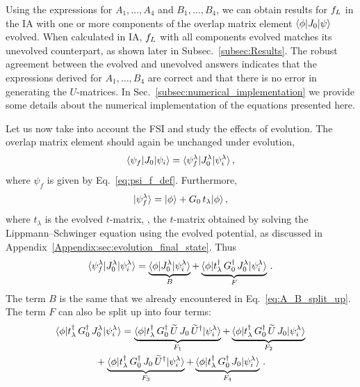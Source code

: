 	Using the expressions for $A_1,\ldots, A_4$ and $B_1,\ldots, B_4$, we can
	obtain results for $f_L$ in the IA with one or more components of the overlap
	matrix element $\langle \phi|J_0|\psi\rangle$ evolved.  When calculated in IA,
	$f_L$ with all components evolved matches its unevolved counterpart, as shown
	later	in Subsec.~\ref{subsec:Results}.
	The robust agreement between the evolved and unevolved answers indicates that
	the expressions derived for $A_1, \ldots, B_4$ are correct and that there is
	no error in generating the $U$-matrices.  In
	Sec.~\ref{subsec:numerical_implementation} we provide some details about the
	numerical implementation of the equations presented here.

	Let us now take into account the FSI and study the effects
	of evolution.  The overlap matrix element should again be unchanged under
	evolution,
	\begin{equation}
	 \langle \psi_f|J_0|\psi_i\rangle
	 = \langle \psi_f^\lambda|J_0^\lambda|\psi_i^\lambda\rangle \,,
	\end{equation}
	where $\psi_f$ is given by Eq.~\eqref{eq:psi_f_def}.  Furthermore,
	\begin{equation}
	 |\psi_f ^\lambda \rangle = | \phi \rangle + G_0 \, t_\lambda |\phi \rangle \,,
	\label{eq:psi_f_lam_def}
	\end{equation}
	where $t_\lambda$ is the evolved $t$-matrix, \ie, the $t$-matrix obtained
	by solving the Lippmann--Schwinger equation using the evolved potential, as
	discussed in Appendix~\ref{Appendix:sec:evolution_final_state}.  Thus
	\begin{equation}
	 \langle \psi_f^\lambda|J_0^\lambda|\psi_i^\lambda\rangle
	 = \underbrace{\langle \phi|J_0^\lambda|\psi_i^\lambda\rangle}_{B}
	 + \underbrace{\langle \phi|t_\lambda ^\dag \, G_0^\dag
	  \, J_0^\lambda|\psi_i^\lambda\rangle}_{F} \,.
	\end{equation}
	The term $B$ is the same that we already encountered in
	Eq.~\eqref{eq:A_B_split_up}.  The term $F$ can also be split up into four
	terms:
	\begin{multline}
	 \mbraket{\phi}{t_\lambda^\dag\,G_0^\dag\,J_0^\lambda}{\psi_i^\lambda}
	 = \underbrace{\mbraket{\phi}{t_\lambda ^\dag \, G_0^\dag \, \widetilde{U}
	  \, J_0 \, \widetilde{U}^\dag}{\psi_i^\lambda}}_{F_1}
	 + \underbrace{\mbraket{\phi}{t_\lambda ^\dag \, G_0^\dag \, \widetilde{U}
	  \, J_0 }{\psi_i^\lambda}}_{F_2} \\
	 \null + \underbrace{\mbraket{\phi}{t_\lambda ^\dag \, G_0^\dag
	  \, J_0 \, \widetilde{U}^\dag}{\psi_i^\lambda}}_{F_3}
	 + \underbrace{\mbraket{\phi}{t_\lambda ^\dag \, G_0^\dag
	  \, J_0}{\psi_i^\lambda}}_{F_4} \,.
	\label{eq:F_split_up}
	\end{multline}
